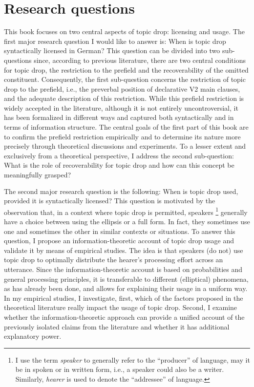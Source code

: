 \section{Research questions}
This book focuses on two central aspects of topic drop: licensing and usage.
The first major research question I would like to answer is:
When is topic drop syntactically licensed in German?
This question can be divided into two sub-questions since, according to previous literature, there are two central conditions for topic drop, the restriction to the prefield and the recoverability of the omitted constituent.
Consequently, the first sub-question concerns the restriction of topic drop to the prefield, i.e., the preverbal position of declarative V2 main clauses, and the adequate description of this restriction.
While this prefield restriction is widely accepted in the literature, although it is not entirely uncontroversial, it has been formalized in different ways and captured both syntactically and in terms of information structure.
The central goals of the first part of this book are to confirm the prefield restriction empirically and to determine its nature more precisely through theoretical discussions and experiments.
To a lesser extent and exclusively from a theoretical perspective, I address the second sub-question:
What is the role of recoverability for topic drop and how can this concept be meaningfully grasped?

The second major research question is the following:
When is topic drop used, provided it is syntactically licensed?
This question is motivated by the observation that, in a context where topic drop is permitted, speakers%
\footnote{I use the term \textit{speaker} to generally refer to the ``producer'' of language, may it be in spoken or in written form, i.e., a speaker could also be a writer.
Similarly, \textit{hearer} is used to denote the ``addressee'' of language.}
%
generally have a choice between using the ellipsis or a full form.
In fact, they sometimes use one and sometimes the other in similar contexts or situations.
To answer this question, I propose an information\hyp theoretic  account of topic drop usage and validate it by means of empirical studies.
The idea is that speakers (do not) use topic drop to optimally distribute the hearer's processing effort across an utterance. 
Since the information\hyp theoretic account is based on probabilities and general processing principles, it is transferable to different (elliptical) phenomena, as has already been done, and allows for explaining their usage in a uniform way.
In my empirical studies, I investigate, first, which of the factors proposed in the theoretical literature really impact the usage of topic drop.
Second, I examine whether the information\hyp theoretic  approach can provide a unified account of the previously isolated claims from the literature and whether it has additional explanatory power.

